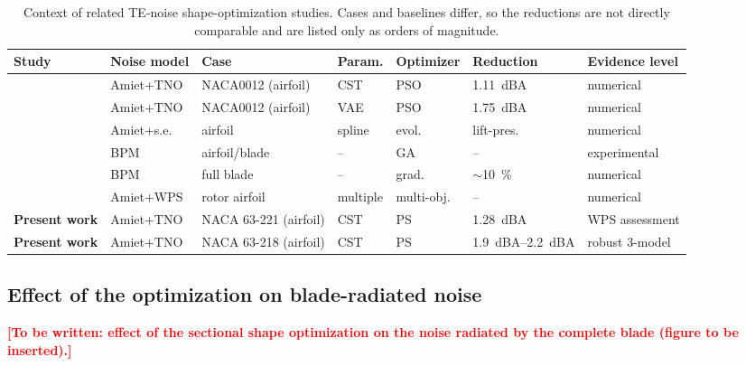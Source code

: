 \documentclass[preprint,3p,times]{elsarticle}
\newcommand{\TODO}[1]{\textcolor{red}{\textbf{[#1]}}}
\begin{document}
\begin{table}[!htbp]\centering
\caption{Context of related TE-noise shape-optimization studies. Cases and
baselines differ, so the reductions are not directly comparable and are listed
only as orders of magnitude.}
\label{tab:lit}
\setlength{\tabcolsep}{4pt}
\begin{tabular}{@{}lllllll@{}}
\toprule
Study & Noise model & Case & Param. & Optimizer & Reduction & Evidence level \\
\midrule
\citet{Kou2023}            & Amiet+TNO & NACA0012 (airfoil) & CST  & PSO & \SI{1.11}{dBA} & numerical \\
\citet{Kou2023}            & Amiet+TNO & NACA0012 (airfoil) & VAE  & PSO & \SI{1.75}{dBA} & numerical \\
\citet{VolkmerCarolus2018} & Amiet+s.e.& airfoil            & spline & evol. & lift-pres. & numerical \\
\citet{Lee2013}            & BPM       & airfoil/blade      & --   & GA  & --           & experimental \\
\citet{RodriguesMarta2014} & BPM       & full blade         & --   & grad. & $\sim$\SI{10}{\percent} & numerical \\
\citet{WonLee2024}         & Amiet+WPS & rotor airfoil      & multiple & multi-obj. & -- & numerical \\
\textbf{Present work}      & Amiet+TNO & NACA 63-221 (airfoil) & CST & PS & \SI{1.28}{dBA} & WPS assessment \\
\textbf{Present work}      & Amiet+TNO & NACA 63-218 (airfoil) & CST & PS & \SIrange{1.9}{2.2}{dBA} & robust 3-model \\
\bottomrule
\end{tabular}
\end{table}

\subsection{Effect of the optimization on blade-radiated noise}\label{sec:blade}
%
\TODO{To be written: effect of the sectional shape optimization on the noise
radiated by the complete blade (figure to be inserted).}
\end{document}
